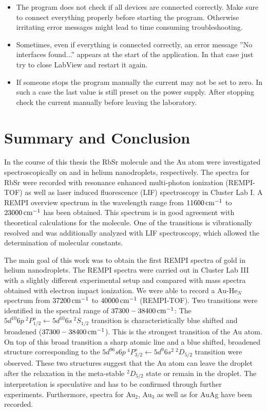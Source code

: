 \documentclass[parskip,12pt,headsepline,a4paper] {scrbook}
\begin{document}
\begin{itemize}
\item The program does not check if all devices are connected correctly. Make sure to connect everything properly before starting the program. Otherwise irritating error messages might lead to time consuming troubleshooting.
\item Sometimes, even if everything is connected correctly, an error message ''No interfaces found...'' appears at the start of the application. In that case just try to close LabView and restart it again.
\item If someone stops the program manually the current may not be set to zero. In such a case the last value is still preset on the power supply. After stopping check the current manually before leaving the laboratory.
\end{itemize}

\chapter{Summary and Conclusion}
In the course of this thesis the RbSr molecule and the Au atom were investigated spectroscopically on and in helium nanodroplets, respectively. The spectra for RbSr were recorded with resonance enhanced multi-photon ionization (REMPI-TOF) as well as laser induced fluorescence (LIF) spectroscopy in Cluster Lab I. A REMPI overview spectrum in the wavelength range from $\unit[11600]{cm^{-1}}$ to $\unit[23000]{cm^{-1}}$ has been obtained. This spectrum is in good agreement with theoretical calculations for the molecule. One of the transitions is vibrationally resolved and was additionally analyzed with LIF spectroscopy, which allowed the determination of molecular constants.

The main goal of this work was to obtain the first REMPI spectra of gold in helium nanodroplets. The REMPI spectra were carried out in Cluster Lab III with a slightly different experimental setup and compared with mass spectra obtained with electron impact ionization. We were able to record a Au-He$_N$ spectrum from $\unit[37200]{cm^{-1}}$ to $\unit[40000]{cm^{-1}}$ (REMPI-TOF). Two transitions were identified in the spectral range of $\unit[37300 - 38400]{cm^{-1}}$: The $5d^{10}6p \ ^2P^o_{1/2} \leftarrow 5d^{10}6s \ ^2S_{1/2}$ transition is characteristically blue shifted and broadened ($\unit[37300 - 38400]{cm^{-1}}$). This is the strongest transition of the Au atom. On top of this broad transition a sharp atomic line and a blue shifted, broadened structure corresponding to the $5d^96s6p \ ^4P^o_{3/2} \leftarrow 5d^{9} 6s^{2} \ ^2D_{5/2}$ transition were observed. These two structures suggest that the Au atom can leave the droplet after the relaxation in the meta-stable $^2D_{5/2}$ state or remain in the droplet. The interpretation is speculative and has to be confirmed through further experiments. Furthermore, spectra for Au$_2$, Au$_3$ as well as for AuAg have been recorded.
\end{document}
